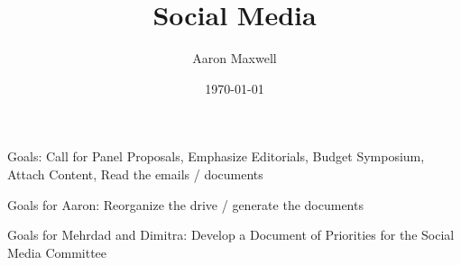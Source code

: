 \documentclass[11pt]{amsart}
\title{Social Media}
\author{Aaron Maxwell}
\date{\today}
\begin{document}
\maketitle
Goals: Call for Panel Proposals, Emphasize Editorials, Budget Symposium, Attach Content, Read the emails / documents

Goals for Aaron: Reorganize the drive / generate the documents

Goals for Mehrdad and Dimitra: Develop a Document of Priorities for the Social Media Committee
\end{document}
